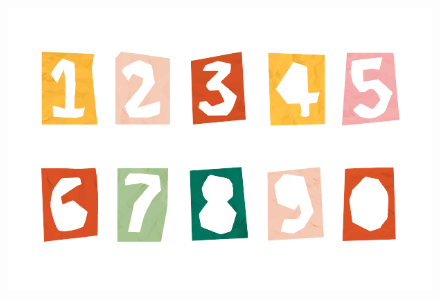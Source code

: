 \begin{figure}[htpb!]
\centering
\includegraphics[width=.7\textwidth]{./media/image16c.png}
\end{figure}

